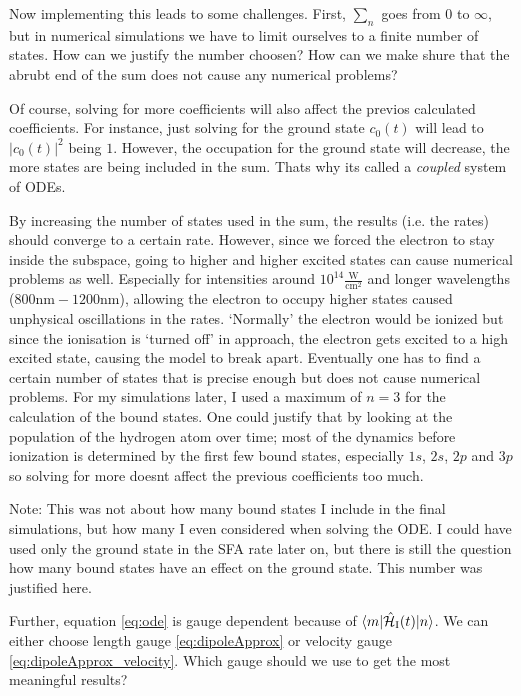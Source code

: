 \medskip
Now implementing this leads to some challenges.
First, $\sum_n$ goes from $0$ to $\infty$, but in numerical simulations we have to limit ourselves to a finite number of states.
How can we justify the number choosen?
How can we make shure that the abrubt end of the sum does not cause any numerical problems?

Of course, solving for more coefficients will also affect the previos calculated coefficients.
For instance, just solving for the ground state $c_0(t)$ will lead to $|c_0(t)|^2$ being $1$.
However, the occupation for the ground state will decrease, the more states are being included in the sum.
Thats why its called a \emph{coupled} system of ODEs.

By increasing the number of states used in the sum, the results (i.e. the rates) should converge to a certain rate.
However, since we forced the electron to stay inside the subspace, going to higher and higher excited states can cause numerical problems as well.
Especially for intensities around $10^{14}\frac{\mathrm{W}}{\mathrm{cm}^2}$ and longer wavelengths ($800\mathrm{nm}-1200\mathrm{nm}$), allowing the electron to occupy higher states caused unphysical oscillations in the rates. 
`Normally' the electron would be ionized but since the ionisation is `turned off' in approach, the electron gets excited to a high excited state, causing the model to break apart.
Eventually one has to find a certain number of states that is precise enough but does not cause numerical problems.
For my simulations later, I used a maximum of $n=3$ for the calculation of the bound states.
One could justify that by looking at the population of the hydrogen atom over time; most of the dynamics before ionization is determined by the first few bound states, especially $1s$, $2s$, $2p$ and $3p$ so solving for more doesnt affect the previous coefficients too much.

Note: This was not about how many bound states I include in the final simulations, but how many I even considered when solving the ODE.
I could have used only the ground state in the SFA rate later on, but there is still the question how many bound states have an effect on the ground state. 
This number was justified here.


\medskip
Further, equation \eqref{eq:ode} is gauge dependent because of $\braket{m|\hat{\mathcal{H}}_{\mathrm{I}}(t)|n}$. 
We can either choose length gauge \eqref{eq:dipoleApprox} or velocity gauge \eqref{eq:dipoleApprox_velocity}.
Which gauge should we use to get the most meaningful results?

